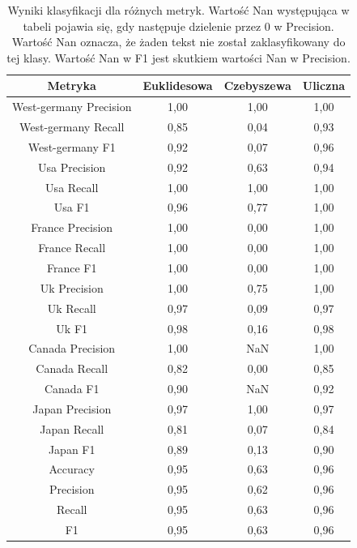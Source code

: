 \documentclass{classrep}
\begin{document}
\newpage
\begin{table}[h!]
\caption{Wyniki klasyfikacji dla różnych metryk. Wartość Nan występująca w tabeli pojawia się, gdy następuje dzielenie przez 0 w Precision. Wartość Nan oznacza, że żaden tekst nie został zaklasyfikowany do tej klasy. Wartość Nan w F1 jest skutkiem wartości Nan w Precision.}
\centering
\vspace{0.1cm}
 \begin{tabular}{c c c c}

    \textbf{Metryka} & \textbf{Euklidesowa}   & \textbf{Czebyszewa}  & \textbf{Uliczna}  \\

\hline
West-germany Precision 		& 1,00 & 1,00 & 1,00 \\
West-germany Recall 		& 0,85 & 0,04 & 0,93 \\
West-germany F1			& 0,92 & 0,07 & 0,96 \\
\hline
Usa Precision 			& 0,92 & 0,63 & 0,94 \\
Usa Recall				& 1,00 & 1,00 & 1,00 \\
Usa F1			 	& 0,96 & 0,77 & 1,00 \\
\hline
France Precision 			& 1,00 & 0,00 & 1,00 \\
France Recall 			& 1,00 & 0,00 & 1,00 \\
France F1 				& 1,00 & 0,00 & 1,00 \\
\hline
Uk Precision 				& 1,00 & 0,75 & 1,00 \\
Uk Recall 				& 0,97 & 0,09 & 0,97 \\
Uk F1 					& 0,98 & 0,16 & 0,98 \\
\hline
Canada Precision			& 1,00 & NaN & 1,00\\
Canada Recall 			& 0,82 & 0,00 & 0,85 \\
Canada F1 				& 0,90 & NaN & 0,92\\
\hline
Japan Precision 			& 0,97 & 1,00 & 0,97 \\
Japan Recall 				& 0,81 & 0,07 & 0,84 \\
Japan F1 				& 0,89 & 0,13 & 0,90 \\
\hline
Accuracy 				& 0,95 & 0,63 & 0,96 \\
Precision 				& 0,95 & 0,62 & 0,96 \\
Recall 					& 0,95 & 0,63 & 0,96 \\	
F1 					& 0,95 & 0,63 & 0,96 \\

\end {tabular}
\label {Wyniki klasyfikacji dla różnych metryk.}
\end{table}
\end{document}
